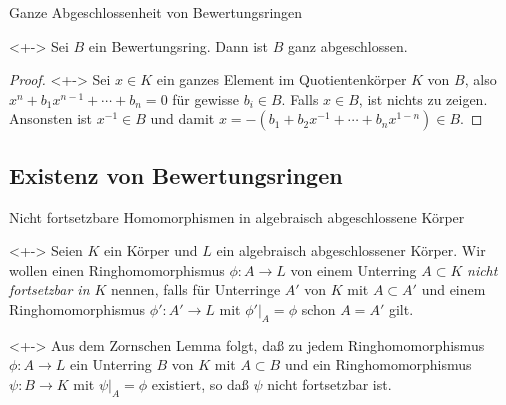 \begin{frame}{Ganze Abgeschlossenheit von Bewertungsringen}
	\begin{proposition}<+->
		Sei \(B\) ein Bewertungsring. Dann ist \(B\) ganz abgeschlossen.
	\end{proposition}
	\begin{proof}<+->
		Sei \(x \in K\) ein ganzes Element im Quotientenkörper \(K\) von \(B\),
		also \(x^n + b_1 x^{n - 1} + \dotsb + b_n = 0\) für gewisse \(b_i \in
		B\). Falls \(x \in B\), ist nichts zu zeigen. Ansonsten ist \(x^{-1}
		\in B\) und damit
		\(x = - (b_1 + b_2 x^{-1} + \dotsb + b_n x^{1 - n}) \in B\).
	\end{proof}
\end{frame}

\subsection{Existenz von Bewertungsringen}

\begin{frame}{Nicht fortsetzbare Homomorphismen in algebraisch abgeschlossene
	Körper}
	\begin{visibleenv}<+->
		Seien \(K\) ein Körper und \(L\) ein algebraisch abgeschlossener Körper.
		Wir wollen einen
		Ringhomomorphismus \(\phi\colon A \to L\) von einem Unterring \(A \subset K\)
		\emph{nicht fortsetzbar in \(K\)}
		nennen, falls für Unterringe \(A'\) von \(K\) mit \(A \subset
		A'\) und einem Ringhomomorphismus \(\phi'\colon A' \to L\) mit
		\(\phi'|_A = \phi\) schon \(A = A'\) gilt.
	\end{visibleenv}
	\begin{remark}<+->
		Aus dem Zornschen Lemma folgt, daß zu jedem Ringhomomorphismus
		\(\phi\colon A \to L\) ein Unterring \(B\) von \(K\) mit
		\(A \subset B\) und ein Ringhomomorphismus \(\psi\colon B \to K\)
		mit \(\psi|_A = \phi\) existiert, so daß \(\psi\) nicht fortsetzbar
		ist.
	\end{remark}
\end{frame}

